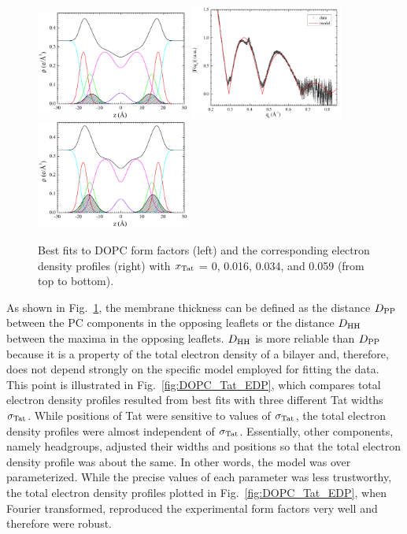 \begin{figure}[htbp]
  \includegraphics[width=0.45\textwidth,valign=t]{figures/Tat/SDP_Results/EDP/DOPC_Tat_28to1_3p0_EDP1}
  \includegraphics[width=0.45\textwidth,valign=t]{figures/Tat/SDP_Results/XFF/DOPC_Tat_16to1_3p0_XFF1}
  \includegraphics[width=0.45\textwidth,valign=t]{figures/Tat/SDP_Results/EDP/DOPC_Tat_16to1_3p0_EDP1}
  \caption{Best fits to DOPC form factors (left) and the corresponding 
  electron density profiles (right) with $x_\textrm{Tat}$ = 0, 0.016, 0.034, 
  and 0.059 (from top to bottom).}
  \label{fig:DOPC_Tat_XFF1}
\end{figure}

As shown in Fig.~\ref{fig:DOPC_Tat_XFF1}, the membrane thickness can be defined
as the distance $D_\textrm{PP}$ between the PC components in the opposing leaflets
or the distance $D_\textrm{HH}$ between the maxima in the opposing leaflets. $D_\textrm{HH}$
is more reliable than $D_\textrm{PP}$ because it is a property of the total 
electron density of a bilayer and, therefore, does not depend strongly on the 
specific model employed for fitting the data. 
This point is illustrated in Fig.~\ref{fig:DOPC_Tat_EDP}, which compares total electron
density profiles resulted from best fits with three different Tat widths $\sigma_\textrm{Tat}$.
While positions of Tat were sensitive to values of $\sigma_\textrm{Tat}$, the total 
electron density profiles were almost independent of $\sigma_\textrm{Tat}$. Essentially,
other components, namely headgroups, adjusted their widths and positions so that
the total electron density profile was about the same.  In other words,
the model was over parameterized.
While the precise values of each parameter was less trustworthy,
the total electron density profiles plotted in Fig.~\ref{fig:DOPC_Tat_EDP},
when Fourier transformed, reproduced the experimental form factors very well
and therefore were robust. 

